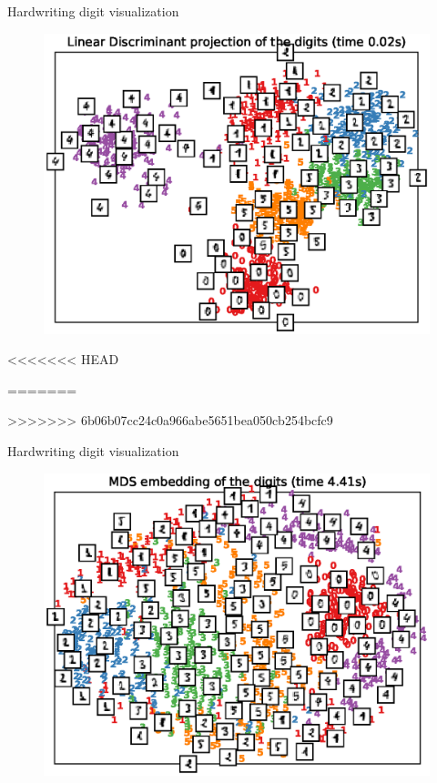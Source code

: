 \documentclass[10pt]{beamer}
\begin{document}
\begin{frame}{Hardwriting digit visualization}
\begin{figure}
\centering
\includegraphics[scale=0.65]{./image/experiment/lda.eps}
\end{figure}
\end{frame}
<<<<<<< HEAD


=======


>>>>>>> 6b06b07cc24c0a966abe5651bea050cb254bcfc9
\begin{frame}{Hardwriting digit visualization}
\begin{figure}
\centering
\includegraphics[scale=0.65]{./image/experiment/mds.eps}
\end{figure}
\end{frame}
\end{document}
